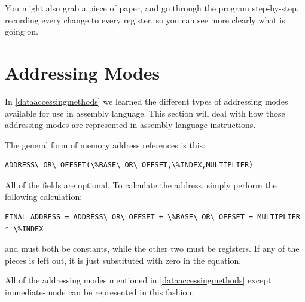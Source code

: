 You might also grab a piece
of paper, and go through the program step-by-step, recording every change
to every register, so you can see more clearly what is going on.

\section{Addressing Modes}
\label{movaddrmodes}

In \autoref{dataaccessingmethods} we learned the different types
of addressing modes available for use in assembly language.  This section
will deal with how those addressing modes are represented in assembly
language instructions.

The general form of memory address references is this:

\begin{simpletyping}
\begin{lstlisting}
ADDRESS\_OR\_OFFSET(\%BASE\_OR\_OFFSET,\%INDEX,MULTIPLIER)
\end{lstlisting}
\end{simpletyping}

All of the fields are optional.  To calculate the address, simply perform
the following calculation:

\begin{simpletyping}
\begin{lstlisting}
FINAL ADDRESS = ADDRESS\_OR\_OFFSET + \%BASE\_OR\_OFFSET + MULTIPLIER * \%INDEX
\end{lstlisting}
\end{simpletyping}

 and  must
both be constants, while the other two must be registers.  If any of the
pieces is left out, it is just substituted with zero in the equation.

All of the addressing modes mentioned in \autoref{dataaccessingmethods} except immediate-mode can be represented in this fashion.

